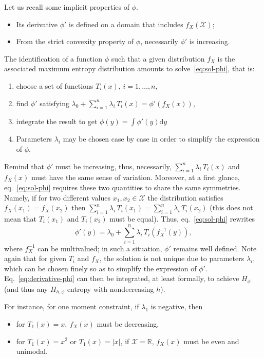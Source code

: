 \documentclass[english]{elsarticle}
\theoremstyle{definition}
\theoremstyle{plain}
\theoremstyle{plain}
\def\d{\mathrm{d}}
\def\Rset{\mathbb{R}}
\def\X{\mathcal{X}}
\begin{document}
Let us recall some implicit properties of $\phi$. 
\begin{itemize}
\item Its derivative $\phi'$ is defined on a domain that includes $f_X(\X)$;
\item  From the  strict convexity  property  of $\phi$,  necessarily $\phi'$  is
  increasing.
\end{itemize}
The identification of a function $\phi$  such that a given distribution $f_X$ is
the associated maximum entropy distribution amounts to solve~\eqref{eq:sol-phi},
that is:
\begin{enumerate}
\item choose a set of functions $T_i(x)$, $i = 1 , \ldots , n$, 
\item find $\phi'$ satisfying ${\displaystyle \lambda_0 + \sum_{i=1}^n \lambda_i
    \, T_i(x) = \phi'(f_X(x))}$,
\item integrate the result to get ${\displaystyle \phi(y) = \int \phi'(y) \d y}$
\item Parameters $\lambda_i$ may be chosen case by case in order to simplify the
  expression of $\phi$.
\end{enumerate}
Remind  that  $\phi'$ must  be  increasing,  thus, necessarily,  ${\displaystyle
  \sum_{i=1}^n \lambda_i  \, T_i(x)}$ and $f_X(x)$  must have the  same sense of
variation. Moreover,  at a  first glance, eq.~\eqref{eq:sol-phi}  requires these
two quantities to share the same symmetries. Namely, if for two different values
$x_1  ,  x_2 \in  \X$  the distribution  satisfies  $f_X(x_1)  = f_X(x_2)$  then
${\displaystyle \sum_{i=1}^n  \lambda_i \, T_i(x_1) =  \sum_{i=1}^n \lambda_i \,
  T_i(x_2)}$ (this does not mean  that $T_i(x_1)$ and $T_i(x_2)$ must be equal).
Thus, eq.~\eqref{eq:sol-phi} rewrites
\begin{equation}\label{eq:derivative-phi}
\phi'(y) = \lambda_0 + \sum_{i=1}^n \lambda_i \, T_i\!\left(f_X^{-1}(y)\right),
\end{equation}
where $f_X^{-1}$ can  be multivalued; in such a  situation, $\phi'$ remains well
defined. Note again  that for given $T_i$ and $f_X$, the  solution is not unique
due to parameters $\lambda_i$, which can  be chosen finely so as to simplify the
expression of $\phi'$.  Eq.~\eqref{eq:derivative-phi} can then be integrated, at
least  formally, to  achieve $H_\phi$  (and thus  any $H_{h,\phi}$  entropy with
nondecreasing $h$).

For instance, for one moment constraint, if $\lambda_1$ is negative, then
\begin{itemize}
\item for $T_1(x) = x, \: f_X(x)$ must be decreasing, 
\item for $T_1(x)  = x^2$ or $T_1(x) =  |x|$, if $\X = \Rset$,  $f_X(x)$ must be
  even and unimodal.
\end{itemize}
\end{document}
